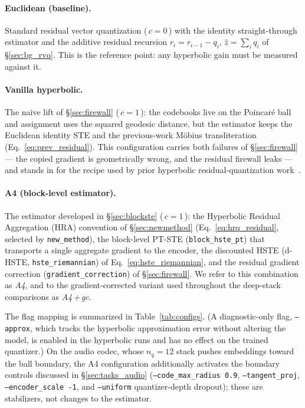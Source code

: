 \documentclass[12pt]{report}
\begin{document}
\paragraph{Euclidean (baseline).} Standard residual vector quantization (\,$c=0$\,) with the identity straight-through estimator and the additive residual recursion $r_i = r_{i-1}-q_i$, $\hat z=\sum_i q_i$ of \S\ref{sec:bg_rvq}. This is the reference point: any hyperbolic gain must be measured against it.

\paragraph{Vanilla hyperbolic.} The naive lift of \S\ref{sec:firewall} (\,$c=1$\,): the codebooks live on the Poincar\'e ball and assignment uses the squared geodesic distance, but the estimator keeps the Euclidean identity STE and the previous-work M\"obius transliteration (Eq.~\ref{eq:prev_residual}). This configuration carries both failures of \S\ref{sec:firewall} --- the copied gradient is geometrically wrong, and the residual firewall leaks --- and stands in for the recipe used by prior hyperbolic residual-quantization work~\cite{hrqvae}.

\paragraph{A4 (block-level estimator).} The estimator developed in \S\ref{sec:blockste} (\,$c=1$\,): the Hyperbolic Residual Aggregation (HRA) convention of \S\ref{sec:newmethod} (Eq.~\ref{eq:hrq_residual}, selected by \texttt{new\_method}), the block-level PT-STE (\texttt{block\_hste\_pt}) that transports a single aggregate gradient to the encoder, the discounted HSTE (d-HSTE, \texttt{hste\_riemannian}) of Eq.~\ref{eq:hste_riemannian}, and the residual gradient correction (\texttt{gradient\_correction}) of \S\ref{sec:firewall}. We refer to this combination as \emph{A4}, and to the gradient-corrected variant used throughout the deep-stack comparisons as \emph{A4\,+\,gc}.

The flag mapping is summarized in Table~\ref{tab:configs}. (A diagnostic-only flag, \texttt{--approx}, which tracks the hyperbolic approximation error without altering the model, is enabled in the hyperbolic runs and has no effect on the trained quantizer.) On the audio codec, whose $n_q=12$ stack pushes embeddings toward the ball boundary, the A4 configuration additionally activates the boundary controls discussed in \S\ref{sec:tasks_audio} (\texttt{--code\_max\_radius 0.9}, \texttt{--tangent\_proj}, \texttt{--encoder\_scale -1}, and \texttt{--uniform} quantizer-depth dropout); these are stabilizers, not changes to the estimator.
\end{document}

